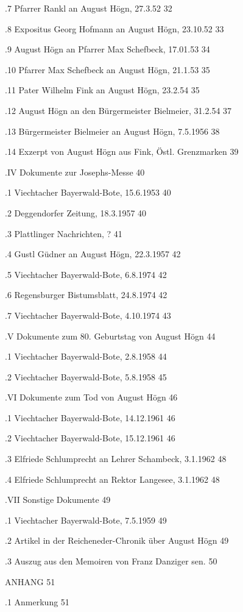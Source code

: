 \documentclass[12pt,a4paper]{book}
\begin{document}
.7 Pfarrer Rankl an August Högn, 27.3.52    32

.8 Expositus Georg Hofmann an August Högn, 23.10.52 33

.9 August Högn an Pfarrer Max Schefbeck, 17.01.53   34

.10 Pfarrer Max Schefbeck an August Högn, 21.1.53   35

.11 Pater Wilhelm Fink an August Högn, 23.2.54  35

.12 August Högn an den Bürgermeister Bielmeier, 31.2.54 37

.13 Bürgermeister Bielmeier an August Högn, 7.5.1956    38

.14 Exzerpt von August Högn aus Fink, Östl. Grenzmarken 39

.IV Dokumente zur Josephs-Messe 40

.1 Viechtacher Bayerwald-Bote, 15.6.1953    40

.2 Deggendorfer Zeitung, 18.3.1957  40

.3 Plattlinger Nachrichten, ?   41

.4 Gustl Güdner an August Högn, 22.3.1957   42

.5 Viechtacher Bayerwald-Bote, 6.8.1974 42

.6 Regensburger Bistumsblatt, 24.8.1974 42

.7 Viechtacher Bayerwald-Bote, 4.10.1974    43

.V Dokumente zum 80. Geburtstag von August Högn 44

.1 Viechtacher Bayerwald-Bote, 2.8.1958     44

.2 Viechtacher Bayerwald-Bote, 5.8.1958 45

.VI Dokumente zum Tod von August Högn   46

.1 Viechtacher Bayerwald-Bote, 14.12.1961   46

.2 Viechtacher Bayerwald-Bote, 15.12.1961   46

.3 Elfriede Schlumprecht an Lehrer Schambeck, 3.1.1962  48

.4 Elfriede Schlumprecht an Rektor Langesee, 3.1.1962   48

.VII Sonstige Dokumente 49

.1 Viechtacher Bayerwald-Bote, 7.5.1959 49

.2 Artikel in der Reicheneder-Chronik über August Högn  49

.3 Auszug aus den Memoiren von Franz Danziger sen.  50

ANHANG  51

.1 Anmerkung    51
\end{document}

